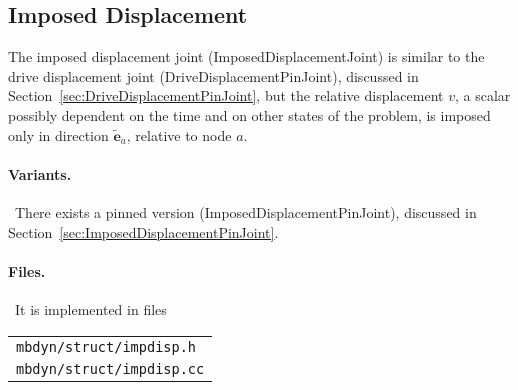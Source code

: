 \documentclass[10pt,dvips,fleqn]{report}
\newcommand{\T}[1]{\boldsymbol{#1}}
\begin{document}
\subsection{Imposed Displacement}
\label{sec:ImposedDisplacementJoint}
The imposed displacement joint (ImposedDisplacementJoint) 
is similar to the drive displacement joint (DriveDisplacementPinJoint),
discussed in Section~\ref{sec:DriveDisplacementPinJoint},
but the relative displacement $v$, a scalar possibly dependent on the time
and on other states of the problem, is imposed only in direction 
$\tilde{\T{e}}_a$, relative to node $a$.

\paragraph{Variants.} \
There exists a pinned version (ImposedDisplacementPinJoint),
discussed in Section~\ref{sec:ImposedDisplacementPinJoint}.

\paragraph{Files.} \
It is implemented in files

\begin{tabular}{l}
\texttt{mbdyn/struct/impdisp.h} \\
\texttt{mbdyn/struct/impdisp.cc}
\end{tabular}
\end{document}
